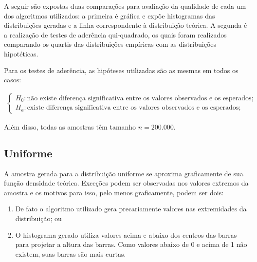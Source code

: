 \documentclass[
]{article}
\providecommand{\tightlist}{%
  \setlength{\itemsep}{0pt}\setlength{\parskip}{0pt}}
\begin{document}
A seguir são expostas duas comparações para avaliação da qualidade de
cada um dos algoritmos utilizados: a primeira é gráfica e expõe
histogramas das distribuições geradas e a linha correspondente à
distribuição teórica. A segunda é a realização de testes de aderência
qui-quadrado, os quais foram realizados comparando os quartis das
distribuições empíricas com as distribuições hipotéticas.

Para os testes de aderência, as hipóteses utilizadas são as mesmas em
todos os casos:

\begin{align}
  \begin{cases}
    H_0: \text{não existe diferença significativa entre os valores observados e os esperados}; \\
    H_a: \text{existe diferença significativa entre os valores observados e os esperados};
  \end{cases}
\end{align}

Além disso, todas as amostras têm tamanho \(n = 200.000\).

\hypertarget{uniforme}{%
\subsection{Uniforme}\label{uniforme}}

A amostra gerada para a distribuição uniforme se aproxima graficamente
de sua função densidade teórica. Exceções podem ser observadas nos
valores extremos da amostra e os motivos para isso, pelo menos
graficamente, podem ser dois:

\begin{enumerate}
\def\labelenumi{\arabic{enumi}.}
\tightlist
\item
  De fato o algoritmo utilizado gera precariamente valores nas
  extremidades da distribuição; ou\\
\item
  O histograma gerado utiliza valores acima e abaixo dos centros das
  barras para projetar a altura das barras. Como valores abaixo de 0 e
  acima de 1 não existem, suas barras são mais curtas.
\end{enumerate}
\end{document}
